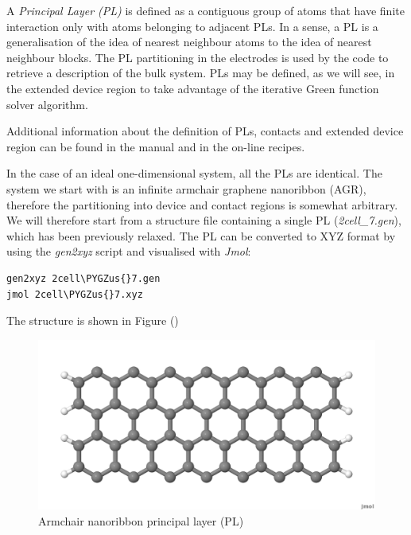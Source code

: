 \documentclass[a4paper,11pt,english]{sphinxmanual}
\def\PYGZus{\char`\_}
\begin{document}
{{A \emph{Principal Layer (PL)} is defined as a contiguous group of atoms
that have finite interaction only with atoms belonging to adjacent
PLs. In a sense, a PL is a generalisation of the idea of nearest
neighbour atoms to the idea of nearest neighbour blocks. The PL
partitioning in the electrodes is used by the code to retrieve a
description of the bulk system. PLs may be defined, as we will see, in
the extended device region to take advantage of the iterative Green
function solver algorithm.

Additional information about the definition of PLs, contacts and
extended device region can be found in the manual and in the on-line
recipes.

In the case of an ideal one-dimensional system, all the PLs are
identical. The system we start with is an infinite armchair graphene
nanoribbon (AGR), therefore the partitioning into device and contact
regions is somewhat arbitrary. We will therefore start from a
structure file containing a single PL (\emph{2cell\_7.gen}), which has been
previously relaxed. The PL can be converted to XYZ format by using the
\emph{gen2xyz} script and visualised with \emph{Jmol}:

\begin{Verbatim}[commandchars=\\\{\}]
gen2xyz 2cell\PYGZus{}7.gen
jmol 2cell\PYGZus{}7.xyz
\end{Verbatim}

The structure is shown in Figure {\hyperref[transport:fig-2cell-7]{\emph{}}} ()
\begin{figure}[htbp]
\centering
\capstart

\includegraphics[width=0.600\linewidth]{2cell_7.png}
\caption{Armchair nanoribbon principal layer (PL)}\label{transport:fig-2cell-7}\end{figure}

}}
\end{document}
